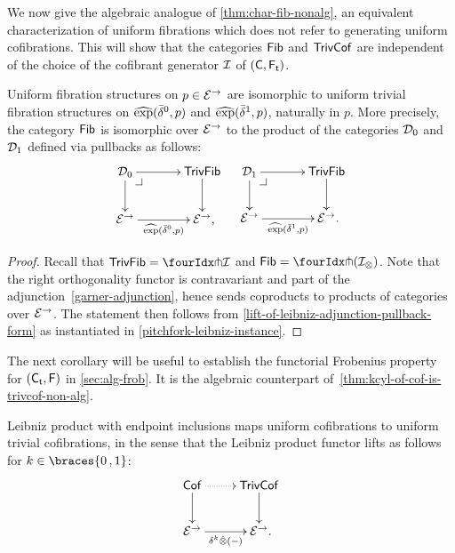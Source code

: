 \documentclass[reqno,10pt,a4paper,oneside,draft]{amsart}
\begin{document}
{{We now give the algebraic analogue of \cref{thm:char-fib-nonalg}, \ie an equivalent characterization of uniform fibrations which does not refer to generating uniform cofibrations. This will show that the categories $\Fib$ and $\TrivCof$ are independent of the choice of the cofibrant generator $\cal{I}$ of $(\CC, \TF)$.

\begin{proposition} \label{prod-exp-general}
Uniform fibration structures on $p \in \cal{E}^\to$ are isomorphic to uniform trivial fibration structures on $\hatexp(\bar{\delta}^0, p)$ and $\hatexp(\bar{\delta}^1, p)$, naturally in $p$.
More precisely, the category $\Fib$ is isomorphic over $\cal{E}^\to$ to the product of the categories $\cal{D}_0$ and $\cal{D}_1$ defined via pullbacks as follows:
\begin{align*}
\xymatrix@C+1em{
  \cal{D}_0
  \ar[r]
  \ar[d]
  \pullback{dr}
&
  \TrivFib
  \ar[d]
\\
  \cal{E}^\to
  \ar[r]_-{\hatexp(\bar{\delta}^0, p)}
&
  \cal{E}^\to
\rlap{,}}
&&
\xymatrix@C+1em{
  \cal{D}_1
  \ar[r]
  \ar[d]
  \pullback{dr}
&
  \TrivFib
  \ar[d]
\\
  \cal{E}^\to
  \ar[r]_-{\hatexp(\bar{\delta}^1, p)}
&
  \cal{E}^\to
\rlap{.}}
\end{align*}
\end{proposition}

\begin{proof}
Recall that $\TrivFib = \liftr{\cal{I}}$ and $\Fib = \liftr{(\cal{I}_\otimes)}$.
Note that the right orthogonality functor is contravariant and part of the adjunction~\eqref{garner-adjunction}, hence sends coproducts to products of categories over $\catE^\to$.
The statement then follows from \cref{lift-of-leibniz-adjunction-pullback-form} as instantiated in \cref{pitchfork-leibniz-instance}.
\end{proof}

The next corollary will be useful to establish the functorial Frobenius property for $(\TC, \FF)$ in \cref{sec:alg-frob}.
It is the algebraic counterpart of~\cref{thm:kcyl-of-cof-is-trivcof-non-alg}.

\begin{corollary} \label{kcyl-of-cof-is-trivcof}
Leibniz product with endpoint inclusions maps uniform cofibrations to uniform trivial cofibrations, in the sense that the Leibniz product functor lifts as follows for $k \in \braces{0\,,1}$:
\[
\xymatrix{
  \Cof
  \ar@{.>}[r]
  \ar[d]
&
  \TrivCof
  \ar[d]
\\
  \cal{E}^\to
  \ar[r]_-{\delta^k \hatotimes (-)}
&
  \cal{E}^\to
\rlap{.}}
\]
\end{corollary}

}}
\end{document}
